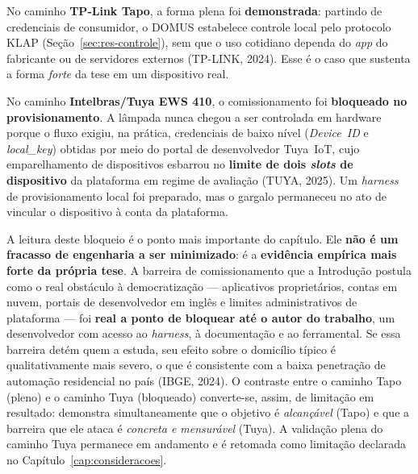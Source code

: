 No caminho \textbf{TP-Link Tapo}, a forma plena foi \textbf{demonstrada}: partindo de
credenciais de consumidor, o DOMUS estabelece controle local pelo protocolo KLAP
(Seção~\ref{sec:res-controle}), sem que o uso cotidiano dependa do \textit{app} do
fabricante ou de servidores externos (TP-LINK, 2024). Esse é o caso que sustenta a
forma \textit{forte} da tese em um dispositivo real.

No caminho \textbf{Intelbras/Tuya EWS 410}, o comissionamento foi \textbf{bloqueado no
provisionamento}. A lâmpada nunca chegou a ser controlada em hardware porque o fluxo
exigiu, na prática, credenciais de baixo nível (\textit{Device~ID} e
\textit{local\_key}) obtidas por meio do portal de desenvolvedor Tuya~IoT, cujo
emparelhamento de dispositivos esbarrou no \textbf{limite de dois \textit{slots} de
dispositivo} da plataforma em regime de avaliação (TUYA, 2025). Um \textit{harness} de
provisionamento local foi preparado, mas o gargalo permaneceu no ato de vincular o
dispositivo à conta da plataforma.

A leitura deste bloqueio é o ponto mais importante do capítulo. Ele \textbf{não é um
fracasso de engenharia a ser minimizado}: é a \textbf{evidência empírica mais forte da
própria tese}. A barreira de comissionamento que a Introdução postula como o real
obstáculo à democratização --- aplicativos proprietários, contas em nuvem, portais de
desenvolvedor em inglês e limites administrativos de plataforma --- foi \textbf{real a
ponto de bloquear até o autor do trabalho}, um desenvolvedor com acesso ao \textit{harness},
à documentação e ao ferramental. Se essa barreira detém quem a estuda, seu efeito sobre
o domicílio típico é qualitativamente mais severo, o que é consistente com a baixa
penetração de automação residencial no país (IBGE, 2024). O contraste entre o caminho
Tapo (pleno) e o caminho Tuya (bloqueado) converte-se, assim, de limitação em resultado:
demonstra simultaneamente que o objetivo é \textit{alcançável} (Tapo) e que a barreira
que ele ataca é \textit{concreta e mensurável} (Tuya). A validação plena do caminho Tuya
permanece em andamento e é retomada como limitação declarada no
Capítulo~\ref{cap:consideracoes}.
